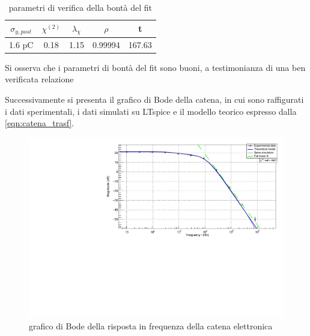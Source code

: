 \documentclass{article}
\begin{document}
\begin{table}[ht]
    \centering
    \begin{tabular}{ccccc}
        \toprule
        $\sigma_{y, post}$    &$\chi^{(2)}$    &$\lambda_{\chi}$   &$\rho$ &t   \\
        \midrule
        1.6 pC                &0.18            &1.15               &0.99994&167.63\\
        \bottomrule
    \end{tabular}
    \caption{parametri di verifica della bontà del fit}
\end{table}

Si osserva che i parametri di bontà del fit sono buoni, a testimonianza di una ben verificata relazione

Successivamente si presenta il grafico di Bode della catena, in cui sono raffigurati i dati sperimentali, i dati simulati
su LTspice e il modello teorico espresso dalla \ref{eqn:catena_trasf}.



\begin{center}
\begin{figure}[H]
\centering
\includegraphics[scale=0.4, angle=0]{bodecatena.pdf}
\caption{grafico di Bode della risposta in frequenza della catena elettronica}
\label{fig:catenaBODE}
\end{figure}
\end{center}
\end{document}
